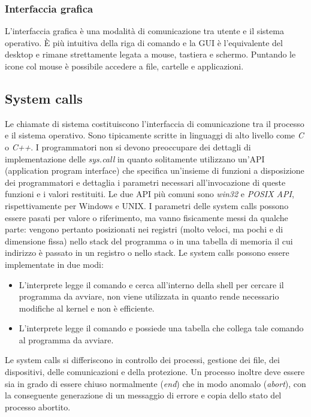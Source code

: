 \subsubsection{Interfaccia grafica}
L'interfaccia grafica \`e una modalit\`a di comunicazione tra utente e il sistema operativo. \`E pi\`u intuitiva della riga di comando e la GUI \`e l'equivalente del desktop e rimane strettamente legata a mouse, tastiera e schermo.
Puntando le icone col mouse \`e possibile accedere a file, cartelle e applicazioni. 
\subsection{System calls}
Le chiamate di sistema costituiscono l'interfaccia di comunicazione tra il processo e il sistema operativo. Sono tipicamente scritte in linguaggi di alto livello come \emph{C} o \emph{C++}. I programmatori non si devono preoccupare dei
dettagli di implementazione delle \emph{sys.call} in quanto solitamente utilizzano un'API (application program interface) che specifica un'insieme di funzioni a disposizione dei programmatori e dettaglia i parametri necessari 
all'invocazione di queste funzioni e i valori restituiti. Le due API pi\`u comuni sono \emph{win32} e \emph{POSIX API}, rispettivamente per Windows e UNIX. I parametri delle system calls possono essere pasati per valore o riferimento, ma
vanno fisicamente messi da qualche parte: vengono pertanto posizionati nei registri (molto veloci, ma pochi e di dimensione fissa) nello stack del programma o in una tabella di memoria il cui indirizzo \`e passato in un registro o nello
stack. Le system calls possono essere implementate in due modi: 
\begin{itemize}
	\item L'interprete legge il comando e cerca all'interno della shell per cercare il programma da avviare, non viene utilizzata in quanto rende necessario modifiche al kernel e non
		\`e efficiente.
	\item L'interprete legge il comando e possiede una tabella che collega tale comando al programma da avviare. 
\end{itemize}
Le system calls si differiscono in controllo dei processi, gestione dei file, dei dispositivi, delle comunicazioni e della protezione. Un processo inoltre 
deve essere sia in grado di essere chiuso normalmente (\emph{end}) che in modo anomalo (\emph{abort}), con la conseguente generazione di un messaggio di 
errore e copia dello stato del processo abortito.
